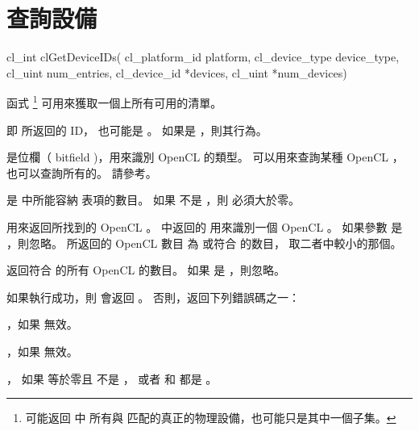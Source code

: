 \section{查詢設備}

\startCLFUNC
cl_int clGetDeviceIDs(
		cl_platform_id platform,
		cl_device_type device_type,
		cl_uint num_entries,
		cl_device_id *devices,
		cl_uint *num_devices)
\stopCLFUNC

函式 \footnote{%
 可能返回  中
所有與  匹配的真正的物理設備，也可能只是其中一個子集。}
可用來獲取一個上所有可用的清單。

 即  所返回的 ID，
也可能是 。
如果是 ，則其行為。

 是位欄（ bitfield )，用來識別 OpenCL 的類型。
可以用來查詢某種 OpenCL ，也可以查詢所有的。
請參考。

{}

 是 中所能容納  表項的數目。
如果  不是 ，則  必須大於零。

 用來返回所找到的 OpenCL 。
 中返回的  用來識別一個 OpenCL 。
如果參數  是 ，則忽略。
所返回的 OpenCL 數目
為  或符合  的数目，
取二者中較小的那個。

 返回符合  的所有 OpenCL 的數目。
如果  是 ，則忽略。

如果執行成功，則  會返回 。
否則，返回下列錯誤碼之一：
\startigBase
\item {}，如果  無效。
\item {}，如果  無效。

\item {}，
如果  等於零且  不是 ，
或者  和  都是 。


